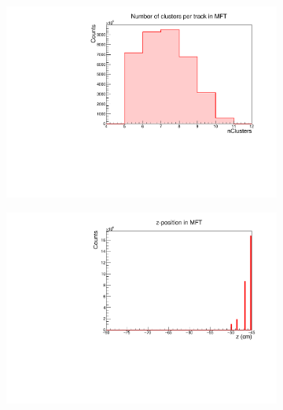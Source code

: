 \begin{figure}[h]
\begin{subfigure}[t]{.49\linewidth}
        \includegraphics[width=\linewidth]{Plots/pass4_MFT/nClusters_pass4.pdf}
        \caption{}
        \label{}
    \end{subfigure}
    \hfill
    \begin{subfigure}[t]{.49\linewidth}
        \centering
        \includegraphics[width=\linewidth]{Plots/pass4_MFT/Z_MFT_pass4.pdf}
        \caption{}
        \label{}
    \end{subfigure}
\caption{}
\label{fig:MFT_1D_pass4}
\end{figure}

